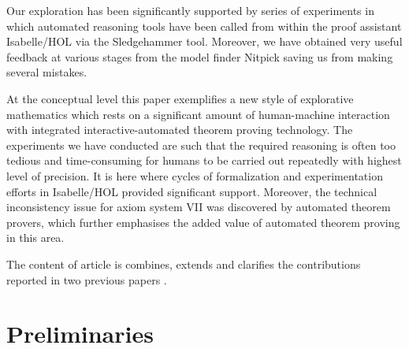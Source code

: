 Our exploration has been significantly supported by series of
experiments in which automated reasoning tools have been called from
within the proof assistant Isabelle/HOL via the
Sledgehammer tool. Moreover, we have obtained
very useful feedback at various stages from the model finder Nitpick
\cite{Nitpick} saving us from making several mistakes.

At the conceptual level this paper exemplifies a new style of
explorative mathematics which rests on a significant amount of
human-machine interaction with integrated interactive-auto\-ma\-ted
theorem proving technology. The experiments we have conducted are such
that the required reasoning is often too tedious and time-consuming
for humans to be carried out repeatedly with highest level of
precision. It is here where cycles of formalization and
experimentation efforts in Isabelle/HOL provided significant
support. Moreover, the technical inconsistency issue for axiom system
VII was discovered by automated theorem provers, which further
emphasises the added value of automated theorem proving in this area.

The content of article is combines, extends and clarifies the
contributions reported in two previous papers \cite{ICMS,ArXiv}.




\section{Preliminaries}
\label{sec:preliminaries}
